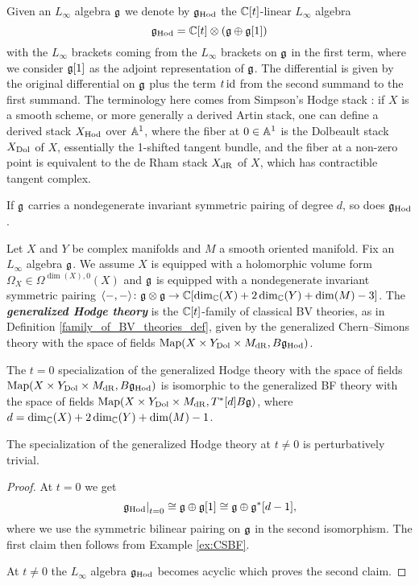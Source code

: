 \documentclass[10pt, oneside]{article}
\newcommand{\Hod}{\mathrm{Hod}}
\newcommand{\defterm}[1]{\textbf{\emph{#1}}}
\begin{document}
Given an $L_\infty$ algebra $\mathfrak g$ we denote by $\fg_{\Hod}$ the $\mathbb C[t]$-linear $L_\infty$ algebra
\[\fg_{\Hod} = \CC[t]\otimes (\fg\oplus \fg[1])\]
with the $L_\infty$ brackets coming from the $L_\infty$ brackets on $\mathfrak g$ in the first term, where we consider $\mathfrak g[1]$ as the adjoint representation of $\mathfrak g$. The differential is given by the original differential on $\mathfrak g$ plus the term $t\operatorname{id}$ from the second summand to the first summand.  The terminology here comes from Simpson's Hodge stack \cite{Simpson}: if $X$ is a smooth scheme, or more generally a derived Artin stack, one can define a derived stack $X_{\mathrm{Hod}}$ over $\mathbb{A}^1$, where the fiber at $0 \in \mathbb{A}^1$ is the Dolbeault stack $X_{\mathrm{Dol}}$ of $X$, essentially the 1-shifted tangent bundle, and the fiber at a non-zero point is equivalent to the de Rham stack $X_{\mathrm{dR}}$ of $X$, which has contractible tangent complex.

If $\mathfrak g$ carries a nondegenerate invariant symmetric pairing of degree $d$, so does $\fg_{\Hod}$.

\begin{definition} \label{Hodge_family_def}
Let $X$ and $Y$ be complex manifolds and $M$ a smooth oriented manifold. Fix an $L_\infty$ algebra $\mathfrak g$. We assume $X$ is equipped with a holomorphic volume form $\Omega_X \in\Omega^{\dim(X), 0}(X)$ and $\mathfrak g$ is equipped with a nondegenerate invariant symmetric pairing $\langle-, -\rangle\colon \mathfrak g\otimes\mathfrak g\rightarrow \mathbb C[\dim_\mathbb C(X) + 2\dim_\mathbb C(Y) + \dim(M) - 3]$. The \defterm{generalized Hodge theory} is the $\mathbb C[t]$-family of classical BV theories, as in Definition \ref{family_of_BV_theories_def}, given by the generalized Chern--Simons theory with the space of fields $\map(X\times Y_{\mr{Dol}}\times M_{\mr{dR}}, B \fg_\Hod)$.
\end{definition}

\begin{prop}
The $t=0$ specialization of the generalized Hodge theory with the space of fields $\map(X\times Y_{\mr{Dol}}\times M_{\mr{dR}}, B \fg_\Hod)$ is isomorphic to the generalized BF theory with the space of fields $\operatorname{Map}(X\times Y_{\mathrm{Dol}}\times M_{\mathrm{dR}}, T^*[d] B \mathfrak g)$, where $d = \dim_\mathbb C(X) + 2\dim_\mathbb C(Y) + \dim(M) - 1$.

The specialization of the generalized Hodge theory at $t\neq 0$ is perturbatively trivial.
\label{prop:Hodgetheoryspecialization}
\end{prop}

\begin{proof}
At $t=0$ we get
\[\left.\fg_\Hod\right|_{t=0}\cong \fg\oplus \fg[1]\cong \fg\oplus \fg^*[d-1],\]
where we use the symmetric bilinear pairing on $\mathfrak g$ in the second isomorphism. The first claim then follows from Example \ref{ex:CSBF}.

At $t\neq 0$ the $L_\infty$ algebra $\fg_\Hod$ becomes acyclic which proves the second claim.
\end{proof}
\end{document}
